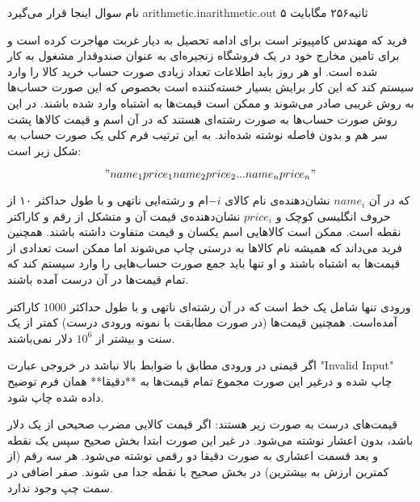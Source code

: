 \gdef\thisproblemauthor{نام صاحب اثر اینجا قرار می‌گیرد}
\gdef\thisproblemdeveloper{نام توسعه‌دهنده اینجا قرار می‌گیرد}
\gdef\thisproblemorigin{\texttt{XXXIII} نام منبع اینجا قرار می‌گیرد}
\begin{problem}{نام سوال اینجا قرار می‌گیرد}
{arithmetic.in}{arithmetic.out}
{۵ ثانیه}{۲۵۶ مگابایت}{}

    فرید که مهندس کامپیوتر است برای ادامه تحصیل به دیار غربت مهاجرت کرده است و برای تامین مخارج خود در یک فروشگاه زنجیره‌ای به عنوان صندوقدار مشغول به کار شده است. او هر روز باید اطلاعات تعداد زیادی صورت حساب‌ خرید کالا را وارد سیستم کند که این کار برایش بسیار خسته‌کننده است بخصوص که این صورت حساب‌ها به روش غریبی صادر می‌شوند و ممکن است قیمت‌ها به اشتباه وارد شده باشند. در این روش صورت‌ حساب‌ها به صورت رشته‌ای هستند که در آن اسم و قیمت کالاها پشت سر هم و بدون فاصله نوشته شده‌‌اند. به این ترتیب فرم کلی یک صورت حساب به شکل زیر است:

    $$"name_1price_1name_2price_2...name_nprice_n"$$

    که در آن $name_i$ نشان‌دهنده‌ی نام کالای ‌$-i$ام و رشته‌ایی ناتهی و با طول حداکثر ۱۰ از حروف انگلیسی کوچک و $price_i$ نشان‌دهنده‌ی قیمت آن و متشکل از رقم و کاراکتر نقطه است.
    ممکن است کالاهایی اسم یکسان و قیمت متفاوت داشته باشند. همچنین فرید می‌داند که همیشه نام کالاها به درستی چاپ می‌شوند اما ممکن است تعدادی از قیمت‌ها به اشتباه باشند و او تنها باید جمع صورت حساب‌هایی را وارد سیستم کند که تمام قیمت‌ها در آن درست آمده باشند.

    \InputFile

    ورودی تنها شامل یک خط است که در آن رشته‌ای ناتهی و با طول حداکثر $1000$ کاراکتر آمده‌است. همچنین قیمت‌ها (در صورت مطابقت با نمونه ورودی درست) کمتر از یک سنت و بیشتر از $10^6$ دلار نمی‌باشند.
    \OutputFile

    اگر قیمتی در ورودی مطابق با ضوابط بالا نباشد در خروجی عبارت "‌Invalid Input" چاپ شده و درغیر این صورت مجموع تمام قیمت‌ها به **دقیقا** همان فرم توضیح داده ‌شده چاپ شود.


    \Examples

    \begin{example}
    \end{example}

    \Explanations

    قیمت‌های درست به صورت زیر هستند:
    اگر قیمت کالایی مضرب صحیحی از یک دلار باشد، بدون اعشار نوشته می‌شود. در غیر این صورت ابتدا بخش صحیح سپس یک نقطه و بعد قسمت اعشاری به صورت دقیقا دو رقمی نوشته می‌شود.
    هر سه رقم (از کمترین ارزش به بیشترین) در بخش صحیح با نقطه جدا می شوند.
    صفر اضافی در سمت چپ وجود ندارد.


\end{problem}
